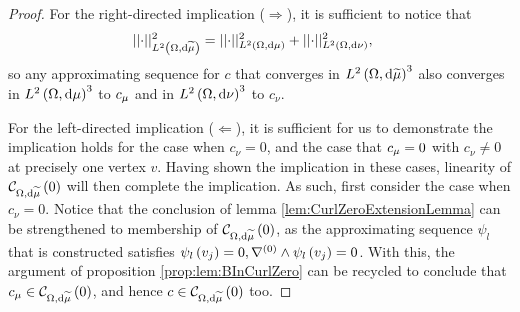 \begin{proof}
	For the right-directed implication ($\Rightarrow$), it is sufficient to notice that 
	\begin{align*}
		\lvert\lvert \cdot \rvert\rvert_{L^{2}\left( \Omega,\mathrm{d}\widetilde{\mu} \right)}^2 &= \lvert\lvert \cdot \rvert\rvert_{L^{2}\left( \Omega,\mathrm{d}\mu \right)}^2 + \lvert\lvert \cdot \rvert\rvert_{L^{2}\left( \Omega,\mathrm{d}\nu \right)}^2,
	\end{align*}
	so any approximating sequence for $c$ that converges in $L^{2}\left( \Omega,\mathrm{d}\widetilde{\mu} \right)^3$ also converges in $L^{2}\left( \Omega,\mathrm{d}\mu \right)^3$ to $c_{\mu}$ and in $L^{2}\left( \Omega,\mathrm{d}\nu \right)^3$ to $c_{\nu}$.
	
	For the left-directed implication ($\Leftarrow$), it is sufficient for us to demonstrate the implication holds for the case when $c_{\nu}=0$, and the case that $c_{\mu}=0$ with $c_{\nu}\neq0$ at precisely one vertex $v$.
	Having shown the implication in these cases, linearity of $\mathcal{C}_{ \Omega, \mathrm{d}\widetilde{\mu}}\left( 0 \right)$ will then complete the implication.
	As such, first consider the case when $c_{\nu}=0$.
	Notice that the conclusion of lemma \ref{lem:CurlZeroExtensionLemma} can be strengthened to membership of $\mathcal{C}_{ \Omega, \mathrm{d}\widetilde{\mu}}\left( 0 \right)$, as the approximating sequence $\psi_l$ that is constructed satisfies $\psi_l\left( v_j \right)=0, \nabla^{(0)}\wedge\psi_l\left( v_j \right)=0$. 
	With this, the argument of proposition \ref{prop:lem:BInCurlZero} can be recycled to conclude that $c_{\mu}\in\mathcal{C}_{ \Omega, \mathrm{d}\widetilde{\mu}}\left( 0 \right)$, and hence $c\in\mathcal{C}_{ \Omega, \mathrm{d}\widetilde{\mu}}\left( 0 \right)$ too.
	

\end{proof}
